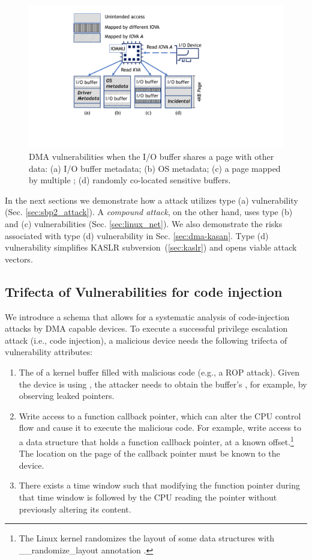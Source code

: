 \begin{figure}[t]
    \centering
    \includegraphics[width=0.9\columnwidth]{figs/subpage.pdf}
    \caption{\subpage{} DMA vulnerabilities when the I/O buffer shares a page with other data: (a) I/O buffer metadata; (b) OS
metadata; (c) a page mapped by multiple \iova; (d) randomly co-located sensitive buffers.}
    \label{fig:colocation}
\end{figure}


In the next sections we demonstrate how a \simple{} attack utilizes type (a) vulnerability (Sec. \ref{sec:sbp2_attack}). A \emph{compound attack}, on the other hand, uses type (b) and (c) vulnerabilities (Sec. \ref{sec:linux_net}). 
We also demonstrate the risks associated with type (d) vulnerability in Sec. \ref{sec:dma-kasan}. Type (d) vulnerability simplifies KASLR subversion~(\ref{sec:kaslr}) and opens viable attack vectors. 


\subsection{Trifecta of Vulnerabilities for code injection}\label{sec:mmo}

We introduce a schema that allows for a systematic analysis of code-injection attacks by DMA capable devices.
To execute a successful privilege escalation attack (i.e., code injection), a malicious device needs the following trifecta of vulnerability attributes:
\begin{enumerate}
    \item The \kva{} of a kernel buffer filled with malicious code (e.g., a ROP attack). Given the device is using \iova, the attacker needs to obtain the buffer's \kva{}, for example, by observing leaked pointers. 
    \item Write access to a function callback pointer, which can alter the CPU control flow and cause it to execute the malicious code. For example, write access to a data structure that holds a function callback pointer, at a known offset.\footnote{The Linux kernel randomizes the layout of some data structures with \_\_randomize\_layout annotation \cite{rand_layout}.} The location on the page of the callback pointer must be known to the device.
    \item There exists a time window such that modifying the function pointer during that time window is followed by the CPU reading the pointer without previously altering its content.
\end{enumerate}

